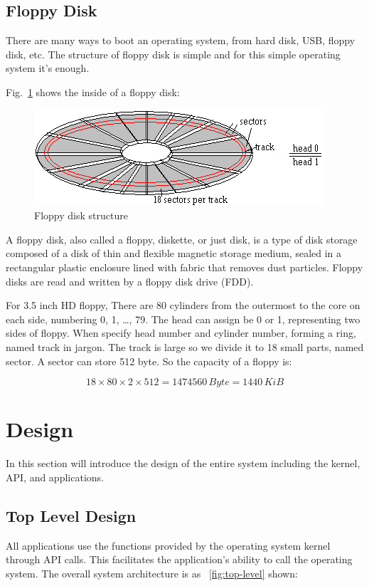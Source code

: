 \documentclass{swfcthesis}
\begin{document}
\section{Floppy Disk}

There are many ways to boot an operating system, from hard disk, USB, floppy disk, etc.
The structure of floppy disk is simple and for this simple operating system it's enough.

Fig.~\ref{fig:flpy1.png} shows the inside of a floppy disk:
\begin{figure}[!ht]
  \centering
  \includegraphics[width=.5\textwidth]{../figs/bootLoader/flpy1.png}
  \caption{Floppy disk structure}
  \label{fig:flpy1.png}
\end{figure}

A floppy disk, also called a floppy, diskette, or just disk, is a type of disk storage
composed of a disk of thin and flexible magnetic storage medium, sealed in a rectangular
plastic enclosure lined with fabric that removes dust particles. Floppy disks are read and
written by a floppy disk drive (FDD)\cite{wiki:floppy}.

For 3.5 inch HD floppy,  There are 80 cylinders from the outermost to
the core on each side, numbering 0, 1, \ldots, 79. The head can assign be 0 or 1,
representing two sides of floppy. When specify head number and cylinder number, forming a
ring, named track in jargon. The track is large so we divide it to 18 small parts, named
sector. A sector can store 512 byte. So the capacity of a floppy is:

\[18 \times 80 \times 2 \times 512 = 1474560\,Byte = 1440\,KiB\]

\fi


\chapter{Design}
In this section will introduce the design of the entire system including the kernel, API,
and applications.


\section{Top Level Design}
All applications use the functions provided by the operating system kernel through API
calls. This facilitates the application's ability to call the operating system. The
overall system architecture is as ~\ref{fig:top-level} shown:
\end{document}
